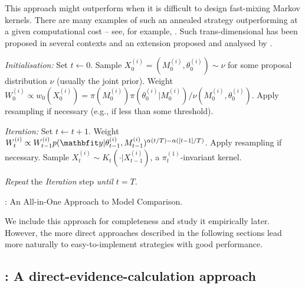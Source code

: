
This approach might outperform \rjmcmc when it is difficult to design
fast-mixing Markov kernels. There are many examples of such an annealed \smc
strategy outperforming \mcmc at a given computational cost -- see, for
example, \cite{Fan:2008tf,Johansen:2008kp,Fearnhead:2010ua}. Such
trans-dimensional \smc has been proposed in several contexts
\cite{Peters:2005wh} and an extension proposed and analysed
by \cite{Jasra:2008bb}.

\begin{algorithm}
\begin{algorithmic}
  \tophrule
  \STATE \emph{Initialisation:} Set $t\leftarrow0$.
  \STATE\STATESKIP Sample $X_0^{(i)} = (M_0^{(i)},\theta_0^{(i)})\sim\nu$
  for some proposal distribution $\nu$ (usually the joint prior).
  \STATE\STATESKIP Weight $W_0^{(i)} \propto w_0(X_0^{(i)}) =
  {\pi(M_0^{(i)}) \pi(\theta^{(i)}_0|M_0^{(i)})}/
  {\nu(M_0^{(i)},\theta_0^{(i)})}$.
  \STATE\STATESKIP Apply resampling if necessary (e.g., if \ess
  \cite{Kong:1994ul} less than some threshold).

  \STATE \emph{Iteration:} Set $t\leftarrow t + 1$.
  \STATE\STATESKIP Weight $W_t^{(i)} \propto W_{t-1}^{(i)}
  p(\data|\theta_{t-1}^{(i)},M_{t-1}^{(i)})^{\alpha(t/T) - \alpha([t-1]/T)}$.
  \STATE\STATESKIP Apply resampling if necessary.
  \STATE\STATESKIP Sample $X_t^{(i)} \sim K_t(\cdot|X_{t-1}^{(i)})$, a
  $\pi_t^{(1)}$-invariant kernel.

  \STATE \emph{Repeat} the \emph{Iteration} step \emph{until $t = T$}.
  \bottomhrule
\end{algorithmic}
\caption{\smc[1]: An All-in-One Approach to Model Comparison.}
\label{alg:smc1}
\end{algorithm}

We include this approach for completeness and study it empirically later.
However, the more direct approaches described in the following sections lead
more naturally to easy-to-implement strategies with good performance.

\subsection{\smc[2]: A direct-evidence-calculation approach}
\label{sub:smc2: A direct-evidence-calculation approach}

